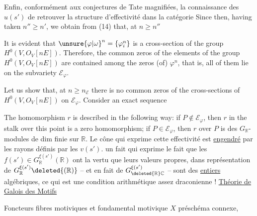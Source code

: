 Enfin, conformément aux conjectures de Tate magnifiées, la connaissance des $u(s')$  de retrouver la structure d'effectivité dans la catégorie
Since
then, having taken $n''\geq n'$, we obtain from (14) that, at $n\geq n''$
\handwritten{\[
\begin{aligned}
&\dim H^1(V,O_V[nE])=\\
&=\dim H^1(V,O_V(-\mathscr{E}_{\varphi})[nE])=\dim H^1(V,O_V[(n-1)E]).
\end{aligned}
\tag*{(15)}
\]}

It is evident that $\unsure{\varphi|\omega}^{n}=\{\varphi_i^{n}\}$ is a cross-section of the group $H^0(V,O_V[nE])$. Therefore, the common zeros of the elements of the group $H^0(V,O_V[nE])$ are contained among the zeros (of) $\varphi^n$, that is, all of them lie on the subvariety $\mathscr{E}_{\varphi}$.

Let us show that, at $n\geq n_{\mathscr{E}}$ there is no common zeros of the cross-sections of $H^0(V,O_V[nE])$ on $\mathscr{E}_{\varphi}$. Consider an exact sequence

The homomorphism $r$ is described in the following way: if $P\notin\mathscr{E}_{\varphi}$, then $r$ in the stalk over this point is a zero homomorphism; if $P\in\mathscr{E}_{\varphi}$, then $r$ over $P$ is
des $G_{\mathbb{R}}$-modules de dim finie sur $\mathbb{R}$. Le cône qui exprime cette effectivité est \uline{engendré} par les  rayons définis par les $v(s')$.  un fait qui exprime  le fait que les  $f(s')\in G_{\mathbb{R}}^{\xi(s')}(\mathbb{R})$ ont la vertu que leurs valeurs propres, dans  représentation de $G_{\mathbb{R}}^{\xi(s')}\deleted{(\mathbb{R})}$ -- et en fait  de $G_{\deleted{\mathbb{R}}\mathbb{C}}^{\xi(s')}$ -- sont des \uline{entiers} algébriques, ce qui est une condition arithmétique assez draconienne !
\uline{Théorie de Galois des Motifs}

\uline{}
Foncteurs fibres motiviques et  fondamental motivique
$X$ préschéma connexe, 

